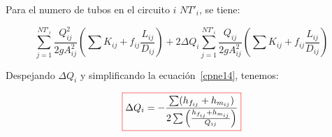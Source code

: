 \documentclass[11pt, oneside]{article}
\begin{document}
Para el numero de tubos en el circuito $i$ $NT'_i$, se tiene:

\begin{equation}
\sum_{j=1}^{NT'_i} \frac{Q_{ij}^2}{2g A_{ij}^2} \left( \sum K_{ij} + f_{ij}\frac{L_{ij}}{D_{ij}} \right) + 2\Delta Q_i \sum_{j=1}^{NT'_i}\frac{Q_{ij}}{2g A_{ij}^2} \left( \sum K_{ij} + f_{ij}\frac{L_{ij}}{D_{ij}} \right)
\label{cpne14}
\end{equation}

Despejando $\Delta Q_i$ y simplificando la ecuaci\'on~\ref{cpne14}, tenemos:

\begin{equation}
\color{red}\boxed{\color{black} \Delta Q_i = - \frac{\sum (h_{f_{ij}}+ h_{m_{ij}})}{2\sum \left(\frac{h_{f_{ij}}+ h_{m_{ij}}}{Q_{ij}} \right)} }
\label{cpne15}
\end{equation}
\end{document}
